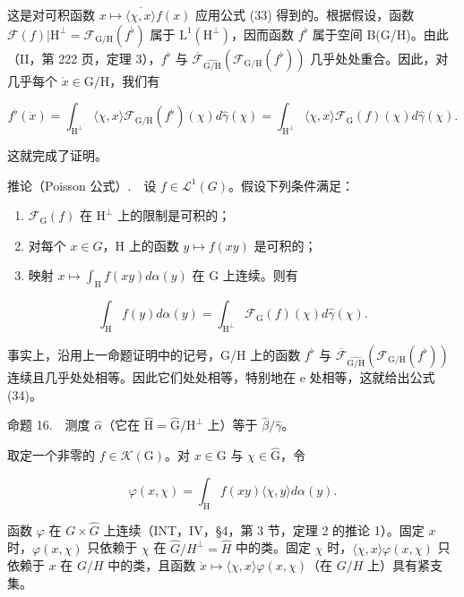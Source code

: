 这是对可积函数 \(x \mapsto \overline{\langle\chi, x\rangle} f(x)\) 应用公式 (33) 得到的。根据假设，函数 \(\mathcal{F}(f)|\mathrm{H}^{\perp} = \mathcal{F}_{\mathrm{G}/\mathrm{H}}(f^{\flat})\) 属于 \(\mathrm{L}^{1}(\mathrm{H}^{\perp})\)，因而函数 \(f^{\flat}\) 属于空间 B(G/H)。由此（II，第 222 页，定理 3），\(f^{\flat}\) 与 \(\overline{\mathcal{F}}_{\widehat{\mathrm{G / H}}}(\mathcal{F}_{\mathrm{G / H}}(f^{\flat}))\) 几乎处处重合。因此，对几乎每个 \(\dot{x}\in \mathrm{G / H}\)，我们有

\[
f ^ {\flat} (\dot {x}) = \int_ {\mathrm{H} ^ {\perp}} \langle \chi , x \rangle \mathcal {F} _ {\mathrm{G/H}} (f ^ {\flat}) (\chi) d \widehat {\gamma} (\chi) = \int_ {\mathrm{H} ^ {\perp}} \langle \chi , x \rangle \mathcal {F} _ {\mathrm{G}} (f) (\chi) d \widehat {\gamma} (\chi).
\]

这就完成了证明。

推论（Poisson 公式）.　设 \(f \in \mathcal{L}^{1}(G)\)。假设下列条件满足：

\begin{enumerate}
\def\labelenumi{(\roman{enumi})}
\item
  \(\mathcal{F}_{\mathrm{G}}(f)\) 在 \(\mathrm{H}^{\perp}\) 上的限制是可积的；
\item
  对每个 \(x \in G\)，H 上的函数 \(y \mapsto f(xy)\) 是可积的；
\item
  映射 \(x\mapsto \int_{\mathrm{H}}f(xy)d\alpha (y)\) 在 G 上连续。则有
\end{enumerate}

\[
\int_ {\mathrm{H}} f (y) d \alpha (y) = \int_ {\mathrm{H} ^ {\perp}} \mathcal {F} _ {\mathrm{G}} (f) (\chi) d \widehat {\gamma} (\chi).\tag{34}
\]

事实上，沿用上一命题证明中的记号，G/H 上的函数 \(f^{\flat}\) 与 \(\overline{\mathcal{F}}_{\widehat{\mathrm{G/H}}}\left(\mathcal{F}_{\mathrm{G/H}}(f^{\flat})\right)\) 连续且几乎处处相等。因此它们处处相等，特别地在 e 处相等，这就给出公式 (34)。

命题 16.　测度 \(\widehat{\alpha}\)（它在 \(\widehat{\mathrm{H}} = \widehat{\mathrm{G}} / \mathrm{H}^{\perp}\) 上）等于 \(\widehat{\beta} / \widehat{\gamma}\)。

取定一个非零的 \(f\in \mathcal{K}(\mathrm{G})\)。对 \(x\in \mathrm{G}\) 与 \(\chi \in \widehat{\mathrm{G}}\)，令

\[
\varphi (x, \chi) = \int_ {\mathrm{H}} f (x y) \langle \chi , y \rangle d \alpha (y).
\]

函数 \(\varphi\) 在 \(G \times \widehat{G}\) 上连续（INT，IV，§4，第 3 节，定理 2 的推论 1）。固定 \(x\) 时，\(\varphi(x, \chi)\) 只依赖于 \(\chi\) 在 \(\widehat{G}/H^{\perp} = \widehat{H}\) 中的类。固定 \(\chi\) 时，\(\langle \chi, x \rangle \varphi(x, \chi)\) 只依赖于 \(x\) 在 \(G/H\) 中的类，且函数 \(\dot{x} \mapsto \langle \chi, x \rangle \varphi(x, \chi)\)（在 \(G/H\) 上）具有紧支集。

